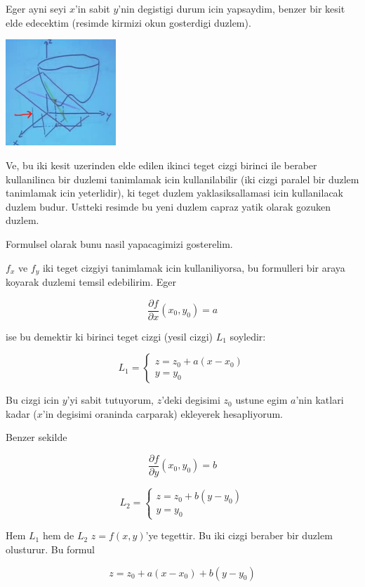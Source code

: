 \documentclass[12pt,fleqn]{article}\usepackage{../common}
\begin{document}
Eger ayni seyi $x$'in sabit $y$'nin degistigi durum icin yapsaydim,
benzer bir kesit elde edecektim (resimde kirmizi okun gosterdigi duzlem). 

\includegraphics[height=4cm]{9_2.png}

Ve, bu iki kesit uzerinden elde edilen ikinci teget cizgi birinci ile beraber
kullanilinca bir duzlemi tanimlamak icin kullanilabilir (iki cizgi paralel
bir duzlem tanimlamak icin yeterlidir), ki teget duzlem yaklasiksallamasi
icin kullanilacak duzlem budur. Ustteki resimde bu yeni duzlem capraz yatik
olarak gozuken duzlem. 

Formulsel olarak bunu nasil yapacagimizi gosterelim.

$f_x$ ve $f_y$ iki teget cizgiyi tanimlamak icin kullaniliyorsa, bu
formulleri bir araya koyarak duzlemi temsil edebilirim. Eger

\[ \frac{\partial f}{\partial x}(x_0,y_0) = a \]

ise bu demektir ki birinci teget cizgi (yesil cizgi) $L_1$ soyledir:

\[ 
L_1 = 
\left\{ \begin{array}{l}
z = z_0 + a(x - x_0) \\
y = y_0
\end{array} \right.
 \]

Bu cizgi icin $y$'yi sabit tutuyorum, $z$'deki degisimi $z_0$ ustune egim
$a$'nin katlari kadar ($x$'in degisimi oraninda carparak) ekleyerek
hesapliyorum. 

Benzer sekilde

\[ \frac{\partial f}{\partial y}(x_0,y_0) = b \]

\[ 
L_2 = 
\left\{ \begin{array}{l}
z = z_0 + b(y - y_0) \\
y = y_0
\end{array} \right.
 \]

Hem $L_1$ hem de $L_2$ $z = f(x,y)$'ye tegettir. Bu iki cizgi beraber bir
duzlem olusturur. Bu formul

\begin{equation}\label{eq2}
z = z_0 + a(x-x_0) + b(y-y_0) 
\end{equation}
\end{document}
